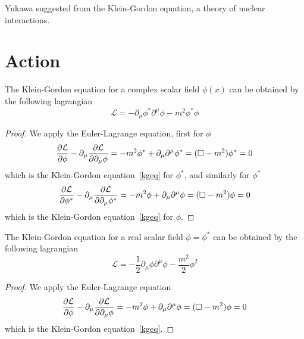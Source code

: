     Yukawa suggested from the Klein-Gordon equation, a theory of nuclear interactions.

\section{Action}

    The Klein-Gordon equation for a complex scalar field $\phi(x)$ can be obtained by the following lagrangian 
    \begin{equation}\label{complkg}
        \mathcal L = - \partial_\mu \phi^* \partial^\mu \phi - m^2 \phi^* \phi
    \end{equation}

    \begin{proof}
        We apply the Euler-Lagrange equation, first for $\phi$
        \begin{equation*}
            \frac{\partial\mathcal L}{\partial\phi} - \partial_\mu \frac{\partial\mathcal L}{\partial\partial_\mu \phi} = - m^2 \phi^* + \partial_\mu \partial^\mu \phi^* = (\Box - m^2) \phi^* = 0
        \end{equation*}
            which is the Klein-Gordon equation~\eqref{kgeq} for $\phi^*$, and similarly for $\phi^*$ 
        \begin{equation*}
            \frac{\partial\mathcal L}{\partial\phi^*} - \partial_\mu \frac{\partial\mathcal L}{\partial\partial_\mu \phi^*} = - m^2 \phi + \partial_\mu \partial^\mu \phi = (\Box - m^2) \phi = 0
        \end{equation*}
        which is the Klein-Gordon equation~\eqref{kgeq} for $\phi$.
    \end{proof}

    The Klein-Gordon equation for a real scalar field $\phi = \phi^*$ can be obtained by the following lagrangian
    \begin{equation}\label{realkg}
        \mathcal L = - \frac{1}{2} \partial_\mu \phi \partial^\mu \phi - \frac{m^2}{2} \phi^2
    \end{equation}

    \begin{proof}
        We apply the Euler-Lagrange equation
        \begin{equation*}
            \frac{\partial\mathcal L}{\partial\phi} - \partial_\mu \frac{\partial\mathcal L}{\partial\partial_\mu \phi} = - m^2 \phi + \partial_\mu \partial^\mu \phi = (\Box - m^2) \phi = 0
        \end{equation*}
            which is the Klein-Gordon equation~\eqref{kgeq}.
    \end{proof}

